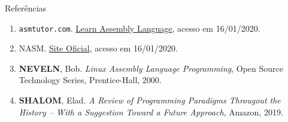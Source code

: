 \begin{frame}[fragile]{Referências}

    \begin{enumerate}
        \item \texttt{asmtutor.com}. \href{https://asmtutor.com/#lesson1}{Learn Assembly Language},
            acesso em 16/01/2020.
  
        \item NASM. \href{https://www.nasm.us/}{Site Oficial}, acesso em 16/01/2020.
 
        \item \textbf{NEVELN}, Bob. \textit{Linux Assembly Language Programming}, Open Source
            Technology Series, Prentice-Hall, 2000.

        \item \textbf{SHALOM}, Elad. \textit{A Review of Programming Paradigms Througout the 
            History -- With a Suggestion Toward a Future Approach}, Amazon, 2019.

    \end{enumerate}

\end{frame}
